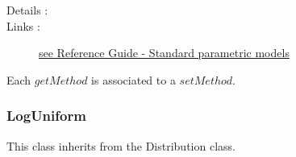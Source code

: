 \begin{description}
\item[Details :]  \rule{0pt}{1em}
  \begin{description}
  \item density probability function :
    $$
    f(x) = \frac{1}{\sqrt{2\pi}\sigma_\ell(x-\gamma)}\;
    e^{-\frac{1}{2}\left(\frac{\log(x-\gamma)-\mu_\ell}{\sigma_\ell}\right)^2}
    \boldsymbol{1}_{[\gamma,+\infty[}(x)
    $$
  \item relation between parameters set :
    \begin{eqnarray*}
      \mu &     =       &   e^{\mu_\ell + \sigma_\ell^2/2} + \gamma             \\
      \sigma     &  =   &  e^{\mu_\ell + \sigma_\ell^2/2} \sqrt{ \left( e^{\sigma_\ell^2} -1 \right)}
    \end{eqnarray*}
    \begin{align*}
      \mbox{where}
      &&
      \mu = \Expect{X}
      &&
      \sigma = \sqrt{\Var X }
    \end{align*}
  \end{description}

\item[Links :]  \rule{0pt}{1em}
  \href{OpenTURNS_ReferenceGuide.pdf}{see Reference Guide - Standard parametric models}
\end{description}

Each  $getMethod$  is associated to a $setMethod$.

\newpage \subsubsection{LogUniform}

This class inherits from the Distribution class.


